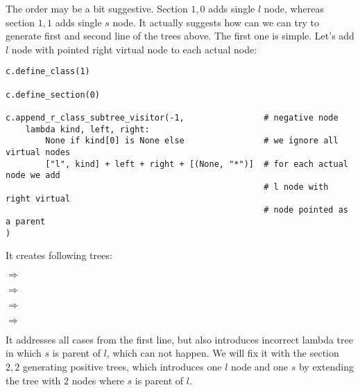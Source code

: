 \documentclass[final]{article}
\theoremstyle{definition}
\theoremstyle{remark}
\newcommand{\includeinlinesvg}[2]{\begin{minipage}{#1\textwidth}\end{minipage}}
\begin{document}
\includeinlinesvg{.33}{lambda__trees_00__2}%
\includeinlinesvg{.33}{lambda__trees_00__3}%
\includeinlinesvg{.33}{lambda__trees_00__7}%

\includeinlinesvg{.33}{lambda__trees_00__4}%
\includeinlinesvg{.33}{lambda__trees_00__12}%
\includeinlinesvg{.33}{lambda__trees_00__13}%

\includeinlinesvg{.16}{lambda__trees_00__0}%
\includeinlinesvg{.16}{lambda__trees_00__1}%
\includeinlinesvg{.16}{lambda__trees_00__5}%
\includeinlinesvg{.16}{lambda__trees_00__6}%
\includeinlinesvg{.16}{lambda__trees_00__14}%
\includeinlinesvg{.16}{lambda__trees_00__15}%

\includeinlinesvg{.25}{lambda__trees_00__8}%
\includeinlinesvg{.25}{lambda__trees_00__9}%
\includeinlinesvg{.25}{lambda__trees_00__10}%
\includeinlinesvg{.25}{lambda__trees_00__11}%

The order may be a bit suggestive. Section \(1,0\) adds single \(l\) node, whereas section \(1,1\) adds single \(s\) node. It actually suggests how can we can try to generate first and second line of the trees above. The first one is simple. Let's add \(l\) node with pointed right virtual node to each actual node:

\begin{lstlisting}
c.define_class(1)

c.define_section(0)

c.append_r_class_subtree_visitor(-1,                # negative node
    lambda kind, left, right:
        None if kind[0] is None else                # we ignore all virtual nodes
        ["l", kind] + left + right + [(None, "*")]  # for each actual node we add
                                                    # l node with right virtual
                                                    # node pointed as a parent
)
\end{lstlisting}

It creates following trees:

\includeinlinesvg{.24}{lambda__trees_100__0_base}\(\Rightarrow\)\includeinlinesvg{.24}{lambda__trees_100__0}%
\includeinlinesvg{.24}{lambda__trees_100__1_base}\(\Rightarrow\)\includeinlinesvg{.24}{lambda__trees_100__1}%

\includeinlinesvg{.24}{lambda__trees_100__2_base}\(\Rightarrow\)\includeinlinesvg{.24}{lambda__trees_100__2}%
\includeinlinesvg{.24}{lambda__trees_100__3_base}\(\Rightarrow\)\includeinlinesvg{.24}{lambda__trees_100__3}%

It addresses all cases from the first line, but also introduces incorrect lambda tree in which \(s\) is parent of \(l\), which can not happen. We will fix it with the section \(2,2\) generating positive trees, which introduces one \(l\) node and one \(s\) by extending the tree with \(2\) nodes where \(s\) is parent of \(l\).
\end{document}
